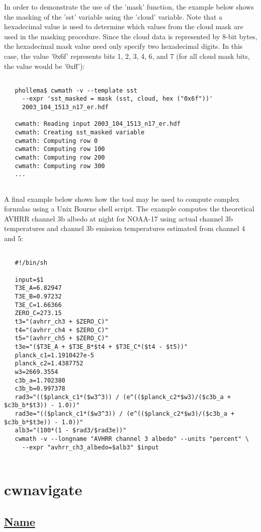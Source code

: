  In order to demonstrate the use of the 'mask' function, the example below shows the masking of the 'sst' variable using the 'cloud' variable. Note that a hexadecimal value is used to determine which values from the cloud mask are used in the masking procedure. Since the cloud data is represented by 8-bit bytes, the hexadecimal mask value need only specify two hexadecimal digits. In this case, the value '0x6f' represents bits 1, 2, 3, 4, 6, and 7 (for all cloud mask bits, the value would be '0xff'):
\begin{verbatim}

   phollema$ cwmath -v --template sst 
     --expr 'sst_masked = mask (sst, cloud, hex ("0x6f"))'
     2003_104_1513_n17_er.hdf

   cwmath: Reading input 2003_104_1513_n17_er.hdf
   cwmath: Creating sst_masked variable
   cwmath: Computing row 0
   cwmath: Computing row 100
   cwmath: Computing row 200
   cwmath: Computing row 300
   ...
 
\end{verbatim}


 A final example below shows how the tool may be used to compute complex formulas using a Unix Bourne shell script. The example computes the theoretical AVHRR channel 3b albedo at night for NOAA-17 using actual channel 3b temperatures and channel 3b emission temperatures estimated from channel 4 and 5:
\begin{verbatim}

   #!/bin/sh
   
   input=$1
   T3E_A=6.82947
   T3E_B=0.97232
   T3E_C=1.66366
   ZERO_C=273.15
   t3="(avhrr_ch3 + $ZERO_C)"
   t4="(avhrr_ch4 + $ZERO_C)"
   t5="(avhrr_ch5 + $ZERO_C)"
   t3e="($T3E_A + $T3E_B*$t4 + $T3E_C*($t4 - $t5))"
   planck_c1=1.1910427e-5
   planck_c2=1.4387752
   w3=2669.3554
   c3b_a=1.702380
   c3b_b=0.997378
   rad3="(($planck_c1*($w3^3)) / (e^(($planck_c2*$w3)/($c3b_a + $c3b_b*$t3)) - 1.0))"
   rad3e="(($planck_c1*($w3^3)) / (e^(($planck_c2*$w3)/($c3b_a + $c3b_b*$t3e)) - 1.0))"
   alb3="(100*(1 - $rad3/$rad3e))"
   cwmath -v --longname "AVHRR channel 3 albedo" --units "percent" \
     --expr "avhrr_ch3_albedo=$alb3" $input
 
\end{verbatim}

\newpage
\section{cwnavigate} \hypertarget{cwnavigate}{}
\subsection*{\underline{Name}}


